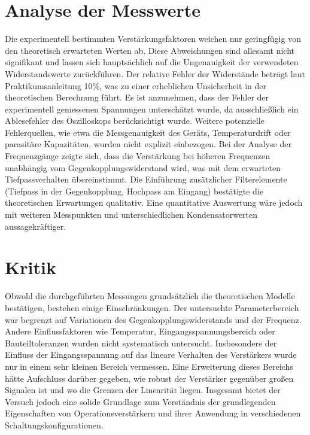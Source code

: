 \section{Analyse der Messwerte}
\label{sec:Analyse}
Die experimentell bestimmten Verstärkungsfaktoren weichen nur geringfügig von den theoretisch erwarteten Werten ab. Diese Abweichungen sind allesamt nicht signifikant und lassen sich hauptsächlich auf die Ungenauigkeit der verwendeten Widerstandswerte zurückführen. Der relative Fehler der Widerstände beträgt laut Praktikumsanleitung 10\%, was zu einer erheblichen Unsicherheit in der theoretischen Berechnung führt. 
Es ist anzunehmen, dass der Fehler der experimentell gemessenen Spannungen unterschätzt wurde, da ausschließlich ein Ablesefehler des Oszilloskops berücksichtigt wurde. Weitere potenzielle Fehlerquellen, wie etwa die Messgenauigkeit des Geräts, Temperaturdrift oder parasitäre Kapazitäten, wurden nicht explizit einbezogen. 
Bei der Analyse der Frequenzgänge zeigte sich, dass die Verstärkung bei höheren Frequenzen unabhängig vom Gegenkopplungswiderstand wird, was mit dem erwarteten Tiefpassverhalten übereinstimmt. Die Einführung zusätzlicher Filterelemente (Tiefpass in der Gegenkopplung, Hochpass am Eingang) bestätigte die theoretischen Erwartungen qualitativ. Eine quantitative Auswertung wäre jedoch mit weiteren Messpunkten und unterschiedlichen Kondensatorwerten aussagekräftiger.

\section{Kritik}
\label{sec:Kritik}
Obwohl die durchgeführten Messungen grundsätzlich die theoretischen Modelle bestätigen, bestehen einige Einschränkungen. Der untersuchte Parameterbereich war begrenzt auf Variationen des Gegenkopplungswiderstands und der Frequenz. Andere Einflussfaktoren wie Temperatur, Eingangsspannungsbereich oder Bauteiltoleranzen wurden nicht systematisch untersucht. 
Insbesondere der Einfluss der Eingangsspannung auf das lineare Verhalten des Verstärkers wurde nur in einem sehr kleinen Bereich vermessen. Eine Erweiterung dieses Bereichs hätte Aufschluss darüber gegeben, wie robust der Verstärker gegenüber großen Signalen ist und wo die Grenzen der Linearität liegen. 
Insgesamt bietet der Versuch jedoch eine solide Grundlage zum Verständnis der grundlegenden Eigenschaften von Operationsverstärkern und ihrer Anwendung in verschiedenen Schaltungskonfigurationen.
